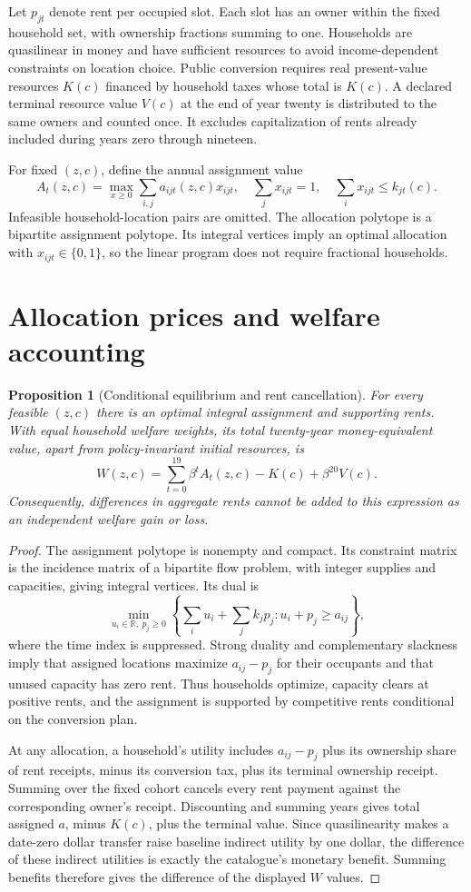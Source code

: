 \documentclass[11pt]{article}
\newtheorem{proposition}{Proposition}
\newcommand{\R}{\mathbb R}
\begin{document}
Let $p_{jt}$ denote rent per occupied slot. Each slot has an owner within the fixed household set, with ownership fractions summing to one. Households are quasilinear in money and have sufficient resources to avoid income-dependent constraints on location choice. Public conversion requires real present-value resources $K(c)$ financed by household taxes whose total is $K(c)$. A declared terminal resource value $V(c)$ at the end of year twenty is distributed to the same owners and counted once. It excludes capitalization of rents already included during years zero through nineteen.

For fixed $(z,c)$, define the annual assignment value
\[
 A_t(z,c)=\max_{x\geq0}\sum_{i,j}a_{ijt}(z,c)x_{ijt},\quad
 \sum_jx_{ijt}=1,\quad \sum_ix_{ijt}\leq k_{jt}(c).
\]
Infeasible household-location pairs are omitted. The allocation polytope is a bipartite assignment polytope. Its integral vertices imply an optimal allocation with $x_{ijt}\in\{0,1\}$, so the linear program does not require fractional households.

\section*{Allocation prices and welfare accounting}
\begin{proposition}[Conditional equilibrium and rent cancellation]
For every feasible $(z,c)$ there is an optimal integral assignment and supporting rents. With equal household welfare weights, its total twenty-year money-equivalent value, apart from policy-invariant initial resources, is
\[
 W(z,c)=\sum_{t=0}^{19}\beta^t A_t(z,c)-K(c)+\beta^{20}V(c).
\]
Consequently, differences in aggregate rents cannot be added to this expression as an independent welfare gain or loss.
\end{proposition}
\begin{proof}
The assignment polytope is nonempty and compact. Its constraint matrix is the incidence matrix of a bipartite flow problem, with integer supplies and capacities, giving integral vertices. Its dual is
\[
 \min_{u_i\in\R,\ p_j\geq0}
 \left\{\sum_i u_i+\sum_j k_jp_j: u_i+p_j\geq a_{ij}\right\},
\]
where the time index is suppressed. Strong duality and complementary slackness imply that assigned locations maximize $a_{ij}-p_j$ for their occupants and that unused capacity has zero rent. Thus households optimize, capacity clears at positive rents, and the assignment is supported by competitive rents conditional on the conversion plan.

At any allocation, a household's utility includes $a_{ij}-p_j$ plus its ownership share of rent receipts, minus its conversion tax, plus its terminal ownership receipt. Summing over the fixed cohort cancels every rent payment against the corresponding owner's receipt. Discounting and summing years gives total assigned $a$, minus $K(c)$, plus the terminal value. Since quasilinearity makes a date-zero dollar transfer raise baseline indirect utility by one dollar, the difference of these indirect utilities is exactly the catalogue's monetary benefit. Summing benefits therefore gives the difference of the displayed $W$ values.
\end{proof}
\end{document}

